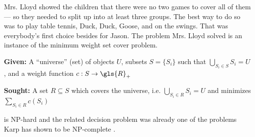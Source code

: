 Mrs. Lloyd showed the children that there were no two games to cover
all of them --- so they needed to split up into at least three groups.
The best way to do so was to play table tennis, Duck, Duck, Goose, and
on the swings. That was everybody's first choice besides for Jason.
The problem Mrs. Lloyd solved is an instance of the minimum weight 
set cover problem.

\begin{problem}\label{prob:mwsc}
  \hfill
  \begin{labeling}{\hspace{4em}}
    \item[\textbf{Given:}]
      A ``universe'' (set) of objects \(U\), 
      subsets \(S = \{S_i\}\)
      such that \(\bigcup\limits_{S_i \in S} S_i = U\),
      and a weight function \(c : S \to \gls{R}_+\)
    \item[\textbf{Sought:}]
      A set \(R \subseteq S\)
      which covers the universe, i.e. 
      \(\bigcup\limits_{S_i \in R} S_i = U\)
      and minimizes \(\sum\limits_{S_i \in R} c(S_i)\)
  \end{labeling}
\end{problem}

 is NP-hard \cite{set_cover} and the related decision 
problem was already one of the problems Karp has shown to be 
NP-complete \cite{set_cover_decision}.

